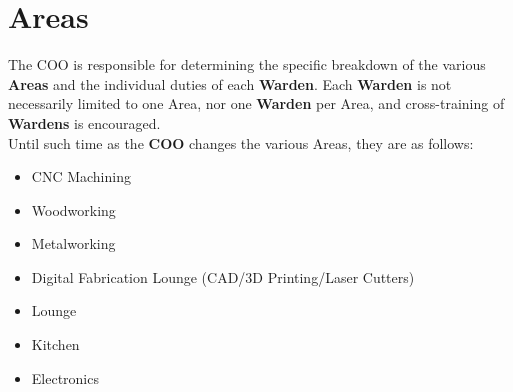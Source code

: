 \documentclass[11pt, oneside]{article}   	%
\begin{document}
\section{Areas}
The COO is responsible for determining the specific breakdown of the various \textbf{Areas} and the individual duties of each \textbf{Warden}.
Each \textbf{Warden} is not necessarily limited to one Area, nor one \textbf{Warden} per Area, and cross-training of \textbf{Wardens} is encouraged.\\
Until such time as the \textbf{COO} changes the various Areas, they are as follows:
\begin{itemize}[noitemsep]
\item CNC Machining
\item Woodworking
\item Metalworking
\item Digital Fabrication Lounge (CAD/3D Printing/Laser Cutters)
\item Lounge
\item Kitchen
\item Electronics
\end{itemize}
\end{document}
